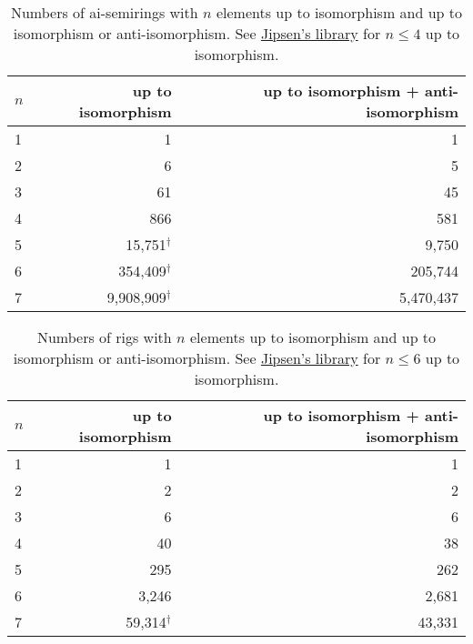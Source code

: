 \documentclass{article}
\theoremstyle{definition}
\theoremstyle{plain}
\begin{document}
\begin{table}[ht]
  \centering
  \begin{tabular}{l|r|r}
    \toprule
    $n$ & up to isomorphism & up to isomorphism + anti-isomorphism \\
    \midrule
    1 & 1         & 1       \\
    2 & 6         & 5       \\
    3 & 61        & 45      \\
    4 & 866       & 581     \\
    5 & 15,751$^\dagger$    & 9,750   \\
    6 & 354,409$^\dagger$   & 205,744 \\
    7 & 9,908,909$^\dagger$ & 5,470,437       \\
  \end{tabular}
  \caption{Numbers of ai-semirings with $n$ elements up to isomorphism and up
    to isomorphism or anti-isomorphism. See
    \href{https://math.chapman.edu/~jipsen/structures/doku.php?id=idempotent_semirings\#finite_members}{Jipsen's
  library} for \(n\leq4\) up to isomorphism.}
  \label{tab:ai-semirings}
\end{table}

\begin{table}[ht]
  \centering
  \begin{tabular}{l|r|r}
    \toprule
    $n$ & up to isomorphism & up to isomorphism + anti-isomorphism \\
    \midrule
    1 & 1         & 1      \\
    2 & 2         & 2      \\
    3 & 6         & 6      \\
    4 & 40        & 38     \\
    5 & 295       & 262    \\
    6 & 3,246     & 2,681  \\
    7 & 59,314$^\dagger$    & 43,331 \\
  \end{tabular}
  \caption{Numbers of rigs with $n$ elements up to isomorphism and up
    to isomorphism or anti-isomorphism. See
    \href{https://math.chapman.edu/~jipsen/structures/doku.php?id=semirings_with_identity_and_zero\#finite_members}{Jipsen's
  library} for \(n\leq6\) up to isomorphism.}
  \label{tab:rigs}
\end{table}
\end{document}
